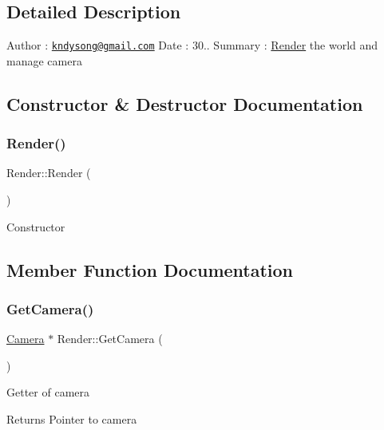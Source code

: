 \subsection{Detailed Description}
Author \+: \href{mailto:kndysong@gmail.com}{\tt kndysong@gmail.\+com} Date \+: 30.. Summary \+: \mbox{\hyperlink{class_render}{Render}} the world and manage camera 

\subsection{Constructor \& Destructor Documentation}
\mbox{\label{class_render_a8610cc11739ef679b5935dd819021351}} 
\subsubsection{\texorpdfstring{Render()}{Render()}}
{\footnotesize\ttfamily Render\+::\+Render (\begin{DoxyParamCaption}{ }\end{DoxyParamCaption})}



Constructor 



\subsection{Member Function Documentation}
\mbox{\label{class_render_a268e4233d982f174d821501251f2a1ca}} 
\subsubsection{\texorpdfstring{Get\+Camera()}{GetCamera()}}
{\footnotesize\ttfamily \mbox{\hyperlink{class_camera}{Camera}} $\ast$ Render\+::\+Get\+Camera (\begin{DoxyParamCaption}{ }\end{DoxyParamCaption})}



Getter of camera 

\begin{DoxyReturn}{Returns}
Pointer to camera
\end{DoxyReturn}
\mbox{\label{class_render_a2752c2703565f6453865bda106aca415}} 
